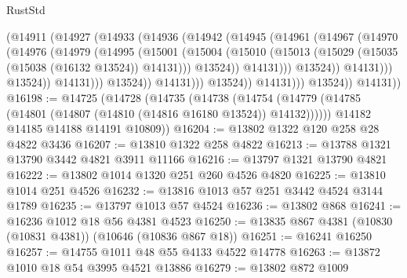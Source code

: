 \begin{lexlean}{RustStd}
\begin{coremodule}
                                (@14911
                                  (@14927
                                    (@14933
                                      (@14936
                                        (@14942
                                          (@14945
                                            (@14961
                                              (@14967
                                                (@14970
                                                  (@14976
                                                    (@14979
                                                      (@14995
                                                        (@15001
                                                          (@15004
                                                            (@15010
                                                              (@15013
                                                                (@15029
                                                                  (@15035
                                                                    (@15038 (@16132 @13524))
                                                                    @14131)))
                                                              @13524))
                                                          @14131)))
                                                    @13524))
                                                @14131)))
                                          @13524))
                                      @14131)))
                                @13524))
                            @14131)))
                      @13524))
                  @14131)))
            @13524))
        @14131))
@16198 := @14725
    (@14728
      (@14735
        (@14738 (@14754 (@14779 (@14785 (@14801 (@14807 (@14810 (@14816 @16180 @13524)) @14132))))))
        @14182
        @14185
        @14188
        @14191
        @10809))
@16204 := @13802 @1322 @120 @258 @28 @4822 @3436
@16207 := @13810 @1322 @258 @4822
@16213 := @13788 @1321 @13790 @3442 @4821 @3911 @11166
@16216 := @13797 @1321 @13790 @4821
@16222 := @13802 @1014 @1320 @251 @260 @4526 @4820
@16225 := @13810 @1014 @251 @4526
@16232 := @13816 @1013 @57 @251 @3442 @4524 @3144 @1789
@16235 := @13797 @1013 @57 @4524
@16236 := @13802 @868
@16241 := @16236 @1012 @18 @56 @4381 @4523
@16250 := @13835 @867 @4381 (@10830 (@10831 @4381)) (@10646 (@10836 @867 @18))
@16251 := @16241 @16250
@16257 := @14755 @1011 @48 @55 @4133 @4522 @14778
@16263 := @13872 @1010 @18 @54 @3995 @4521 @13886
@16279 := @13802
    @872
    @1009

\end{coremodule}
\end{lexlean}
